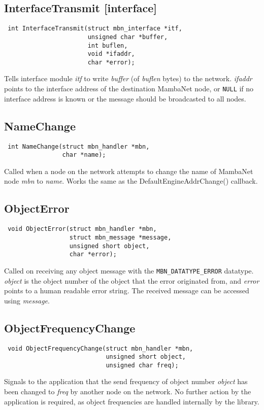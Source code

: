 \documentclass[a4paper]{report}
\begin{document}
\subsection{InterfaceTransmit \footnotesize{[interface]}}
\begin{verbatim}
 int InterfaceTransmit(struct mbn_interface *itf,
                       unsigned char *buffer,
                       int buflen,
                       void *ifaddr,
                       char *error);
\end{verbatim}
Tells interface module \textit{itf} to write \textit{buffer} (of \textit{buflen} bytes) to the network. \textit{ifaddr} points to the interface address of the destination MambaNet node, or \verb|NULL| if no interface address is known or the message should be broadcasted to all nodes.


\subsection{NameChange}
\begin{verbatim}
 int NameChange(struct mbn_handler *mbn,
                char *name);
\end{verbatim}
Called when a node on the network attempts to change the name of MambaNet node \textit{mbn} to \textit{name}. Works the same as the DefaultEngineAddrChange() callback.


\subsection{ObjectError}
\begin{verbatim}
 void ObjectError(struct mbn_handler *mbn,
                  struct mbn_message *message,
                  unsigned short object,
                  char *error);
\end{verbatim}
Called on receiving any object message with the \verb|MBN_DATATYPE_ERROR| datatype. \textit{object} is the object number of the object that the error originated from, and \textit{error} points to a human readable error string. The received message can be accessed using \textit{message}.


\subsection{ObjectFrequencyChange}
\begin{verbatim}
 void ObjectFrequencyChange(struct mbn_handler *mbn,
                            unsigned short object,
                            unsigned char freq);
\end{verbatim}
Signals to the application that the send frequency of object number \textit{object} has been changed to \textit{freq} by another node on the network. No further action by the application is required, as object frequencies are handled internally by the library.
\end{document}
